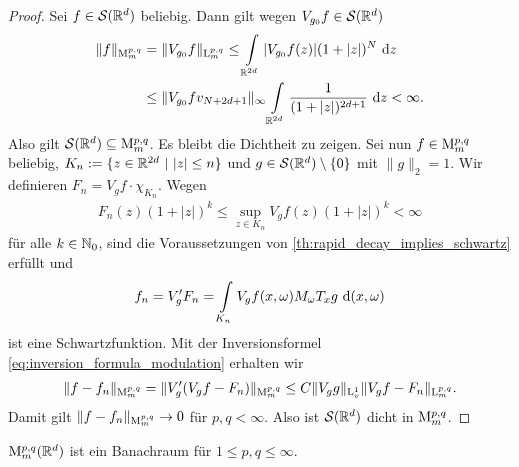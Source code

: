 \begin{proof}
	Sei $ f \in \mathcal{S}(\mathbb{R}^d) $ beliebig.	
	Dann gilt wegen $ V_{g_0} f \in \mathcal{S}(\mathbb{R}^d) $ 
	\begin{align*}
	\| f \|_{\mathrm{M}_m^{p,q}}
	&=
	\| V_{g_0} f \|_{\mathrm{L}_m^{p,q}}
	\leq
	\int \limits_{\mathbb{R}^{2d}} | V_{g_0} f(z) | (1+ |z|)^N  \text{ d} z\\
	&\leq 
	\| V_{g_0} f v_{N+2d+1} \|_\infty 
	\int \limits_{\mathbb{R}^{2d}}
	\frac{1}{(1+|z|)^{2d+1}} \text{ d} z
	< \infty.
	\end{align*}
	Also gilt $ \mathcal{S}(\mathbb{R}^d) \subseteq \mathrm{M}^{p,q}_m $. Es bleibt die Dichtheit zu zeigen.
	Sei nun $ f \in \mathrm{M}_m^{p,q} $ beliebig, $ K_n := \{z \in \mathbb{R}^{2d} \ | \ |z| \leq n \} $ und $ g\in \mathcal{S}(\mathbb{R}^d) \setminus \{0\} $ mit $ \| g \|_2 = 1 $.
	Wir definieren $ F_n = V_g f \cdot \chi_{K_n} $.
	Wegen 
	\begin{align*}
	F_n(z) (1 + |z|)^k 
	\leq
	\sup \limits_{z \in K_n} V_g f(z) (1+|z|)^k < \infty 
	\end{align*}
	für alle $ k \in \mathbb{N}_0 $, sind die Voraussetzungen von \ref{th:rapid_decay_implies_schwartz} erfüllt und
	\begin{align*}
	f_n 
	=
	V_g^\prime F_n 
	=
	\int \limits_{K_n} V_g f (x,\omega) M_\omega T_x g  \text{ d} (x,\omega)
	\end{align*}
	ist eine Schwartzfunktion. Mit der Inversionsformel \eqref{eq:inversion_formula_modulation} erhalten wir
	\begin{align*}
	\| f - f_n \|_{\mathrm{M}_m^{p,q}} 
	=
	\| V_g^\prime (V_g f - F_n) \|_{\mathrm{M}_m^{p,q}}
	\leq C \| V_g g \|_{\mathrm{L}^1_v} \| V_g f - F_n \|_{\mathrm{L}^{p,q}_m}.
	\end{align*}
	Damit gilt $ \| f - f_n \|_{\mathrm{M}_m^{p,q}} \to 0  $ für $ p,q < \infty  $.
	Also ist $ \mathcal{S}(\mathbb{R}^d) $ dicht in $ \mathrm{M}_m^{p,q} $.
\end{proof}

\begin{sz}\label{th:mod_space_banach}
	$ \mathrm{M}^{p,q}_m(\mathbb{R}^d) $ ist ein Banachraum für $ 1 \leq p,q \leq \infty $.
\end{sz}

